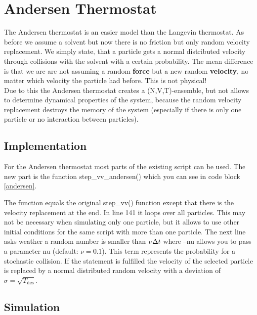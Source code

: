 \section{Andersen Thermostat}

The Andersen thermostat is an easier model than the Langevin thermostat. 
As before we assume a solvent but now there is no friction but only random velocity replacement. 
We simply state, that a particle gets a normal distributed velocity through collisions with the solvent with a certain probability. 
The mean difference is that we are are not assuming a random \textbf{force} but a new random \textbf{velocity}, no matter which velocity the particle had before.
This is not physical!\\

Due to this the Andersen thermostat creates a (N,V,T)-ensemble, but not allows to determine dynamical properties of the system, because the random velocity replacement destroys the memory of the system (especially if there is only one particle or no interaction between particles).

\subsection{Implementation}

For the Andersen thermostat most parts of the existing script can be used.
The new part is the function step\_vv\_andersen() which you can see in code block \ref{andersen}.


The function equals the original step\_vv() function except that there is the velocity replacement at the end.
In line 141 it loops over all particles.
This may not be necessary when simulating only one particle, but it allows to use other initial conditions for the same script with more than one particle.
The next line asks weather a random number is smaller than $\nu \Delta t$ where --nu allows you to pass a parameter nu (default: $\nu =0.1$).
This term represents the probability for a stochastic collision.
If the statement is fulfilled the velocity of the selected particle is replaced by a normal distributed random velocity with a deviation of $\sigma =\sqrt{T_\text{des}}$.

\subsection{Simulation}

